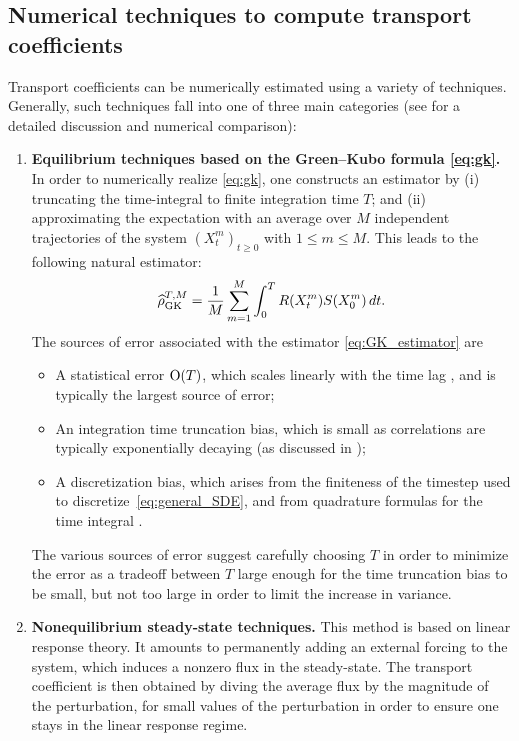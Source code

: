\subsection{Numerical techniques to compute transport coefficients}
\label{subsec:num_tech}
%
Transport coefficients can be numerically estimated using a variety of techniques. Generally, such techniques fall into one of three main categories (see \cite{acta_numerica2016,mcqmc_stoltz2022} for a detailed discussion and numerical comparison):
%
    \begin{enumerate}
    \item {\bf Equilibrium techniques based on the Green--Kubo formula \eqref{eq:gk}.} In order to numerically realize \eqref{eq:gk}, one constructs an estimator by (i) truncating the time-integral to finite integration time $T$; and (ii) approximating the expectation with an average over $M$ independent trajectories of the system $(X_t^m)_{t\geq 0}$ with $1\leq m\leq M$. This leads to the following natural estimator:
    \begin{equation}
        \mathcal{\widehat{\rho}}^{T,M}_{\rm GK} = \frac{1}{M}\sum_{m=1}^M \int_0^T R(X_t^m)S(X_0^m) \, dt.
        \label{eq:GK_estimator}
    \end{equation}
    The sources of error associated with the estimator \eqref{eq:GK_estimator} are
    \begin{itemize}
    	\item A statistical error $\mathrm{O}(T)$, which scales linearly with the time lag \cite{oliveira2017,sensitivity2022,raphael}, and is typically the largest source of error;
    	\item An integration time truncation bias, which is small as correlations are typically exponentially decaying (as discussed in \cite{sensitivity2022});
    	\item A discretization bias, which arises from the finiteness of the timestep used to discretize~\eqref{eq:general_SDE}, and from quadrature formulas for the time integral \cite{averages2016,acta_numerica2016}.
    \end{itemize}
    The various sources of error suggest carefully choosing $T$ in order to minimize the error as a tradeoff between $T$ large enough for the time truncation bias to be small, but not too large in order to limit the increase in variance.
    
    \item {\bf Nonequilibrium steady-state techniques.} This method is based on linear response theory. It amounts to permanently adding an external forcing to the system, which induces a nonzero flux in the steady-state. The transport coefficient is then obtained by diving the average flux by the magnitude of the perturbation, for small values of the perturbation in order to ensure one stays in the linear response regime.
       

\end{enumerate}
